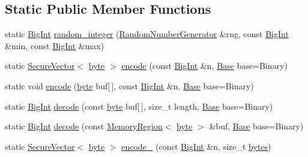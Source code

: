 \subsection*{Static Public Member Functions}
\begin{DoxyCompactItemize}
\item 
static \hyperlink{classBotan_1_1BigInt}{Big\-Int} \hyperlink{classBotan_1_1BigInt_a3527141b4817c62dfc0fb1ecb07c712b}{random\-\_\-integer} (\hyperlink{classBotan_1_1RandomNumberGenerator}{Random\-Number\-Generator} \&rng, const \hyperlink{classBotan_1_1BigInt}{Big\-Int} \&min, const \hyperlink{classBotan_1_1BigInt}{Big\-Int} \&max)
\item 
static \hyperlink{classBotan_1_1SecureVector}{Secure\-Vector}$<$ \hyperlink{namespaceBotan_a7d793989d801281df48c6b19616b8b84}{byte} $>$ \hyperlink{classBotan_1_1BigInt_a57c8e203bf361b30b8a4aac97d619d61}{encode} (const \hyperlink{classBotan_1_1BigInt}{Big\-Int} \&n, \hyperlink{classBotan_1_1BigInt_a2f432a3a957f2e25c78af361ab662a23}{Base} base=Binary)
\item 
static void \hyperlink{classBotan_1_1BigInt_a138c75cbeb4cc35a5f2fca979ff0186b}{encode} (\hyperlink{namespaceBotan_a7d793989d801281df48c6b19616b8b84}{byte} buf\mbox{[}$\,$\mbox{]}, const \hyperlink{classBotan_1_1BigInt}{Big\-Int} \&n, \hyperlink{classBotan_1_1BigInt_a2f432a3a957f2e25c78af361ab662a23}{Base} base=Binary)
\item 
static \hyperlink{classBotan_1_1BigInt}{Big\-Int} \hyperlink{classBotan_1_1BigInt_a263747b1ecb42572b6a538ccd69fd8cb}{decode} (const \hyperlink{namespaceBotan_a7d793989d801281df48c6b19616b8b84}{byte} buf\mbox{[}$\,$\mbox{]}, size\-\_\-t length, \hyperlink{classBotan_1_1BigInt_a2f432a3a957f2e25c78af361ab662a23}{Base} base=Binary)
\item 
static \hyperlink{classBotan_1_1BigInt}{Big\-Int} \hyperlink{classBotan_1_1BigInt_a9b7f81edbda01e18db849786f376f50a}{decode} (const \hyperlink{classBotan_1_1MemoryRegion}{Memory\-Region}$<$ \hyperlink{namespaceBotan_a7d793989d801281df48c6b19616b8b84}{byte} $>$ \&buf, \hyperlink{classBotan_1_1BigInt_a2f432a3a957f2e25c78af361ab662a23}{Base} base=Binary)
\item 
static \hyperlink{classBotan_1_1SecureVector}{Secure\-Vector}$<$ \hyperlink{namespaceBotan_a7d793989d801281df48c6b19616b8b84}{byte} $>$ \hyperlink{classBotan_1_1BigInt_a0fae945cc053683ebdd5bc9dcdd87f86}{encode\-\_} (const \hyperlink{classBotan_1_1BigInt}{Big\-Int} \&n, size\-\_\-t \hyperlink{classBotan_1_1BigInt_a8a79a95801b88a44334115b85ce1bc63}{bytes})
\end{DoxyCompactItemize}


